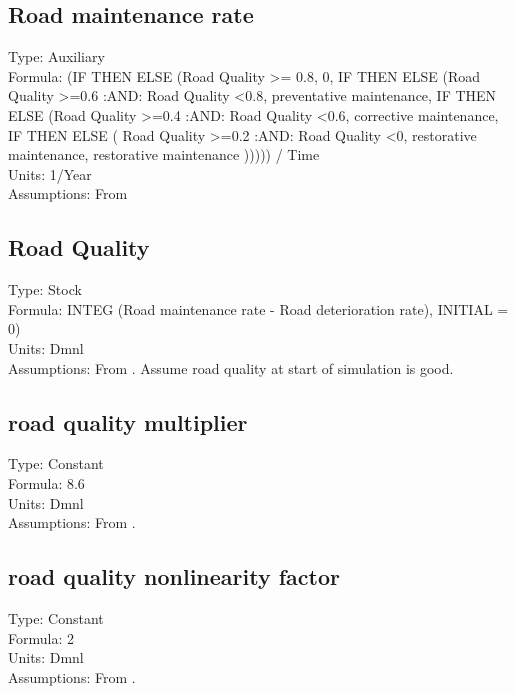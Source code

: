 \documentclass[
  11pt,
]{book}
\begin{document}
\hypertarget{road-maintenance-rate}{%
\subsection{Road maintenance rate}\label{road-maintenance-rate}}

Type: Auxiliary\\
Formula: (IF THEN ELSE (Road Quality \textgreater= 0.8, 0, IF THEN ELSE (Road Quality \textgreater=0.6 :AND: Road Quality \textless0.8, preventative maintenance, IF THEN ELSE (Road Quality \textgreater=0.4 :AND: Road Quality \textless0.6, corrective maintenance, IF THEN ELSE ( Road Quality \textgreater=0.2 :AND: Road Quality \textless0, restorative maintenance, restorative maintenance ))))) / Time\\
Units: 1/Year\\
Assumptions: From \citet{fallah-fini_measuring_2015}

\hypertarget{road-quality}{%
\subsection{Road Quality}\label{road-quality}}

Type: Stock\\
Formula: INTEG (Road maintenance rate - Road deterioration rate), INITIAL = 0)\\
Units: Dmnl\\
Assumptions: From \citet{fallah-fini_measuring_2015}. Assume road quality at start of simulation is good.

\hypertarget{road-quality-multiplier}{%
\subsection{road quality multiplier}\label{road-quality-multiplier}}

Type: Constant\\
Formula: 8.6\\
Units: Dmnl\\
Assumptions: From \citet{fallah-fini_measuring_2015}.

\hypertarget{road-quality-nonlinearity-factor}{%
\subsection{road quality nonlinearity factor}\label{road-quality-nonlinearity-factor}}

Type: Constant\\
Formula: 2\\
Units: Dmnl\\
Assumptions: From \citet{fallah-fini_measuring_2015}.
\end{document}
